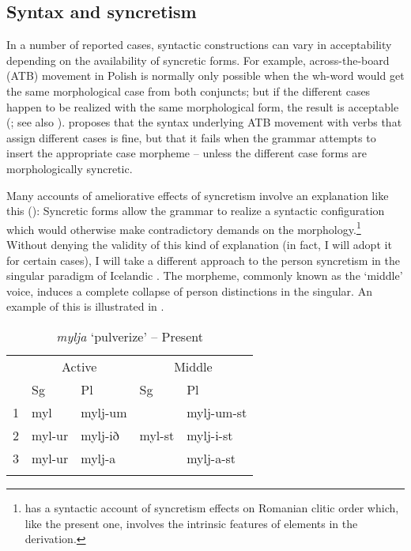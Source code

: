 \documentclass[output=paper]{langscibook}
\begin{document}
\subsection{Syntax and syncretism} 

In a number of reported cases, syntactic constructions can vary in acceptability depending on the availability of syncretic forms. For example, across-the-board (ATB)  movement in Polish is normally only possible when the wh-word would get the same morphological case from both conjuncts; but if the different cases happen to be realized with the same morphological form, the result is acceptable (\citealt{citko2005nature,hein2020case}; see also \citealt[fn2]{Ximenes:2007vs}). \citet{citko2005nature} proposes that the syntax underlying ATB movement with verbs that assign different cases is fine, but that it fails when the grammar attempts to insert the appropriate case morpheme -- unless the different case forms are morphologically syncretic. 

Many accounts of ameliorative effects of syncretism involve an explanation like this (\citealt{pullum1986phonological,bejar1999multiple,Kratzer:2009jq,Ussery:2009jd,Bjorkman2016}): Syncretic forms allow the grammar to realize a syntactic configuration which would otherwise make contradictory demands on the morphology.\footnote{\citet{Savescu:2009al} has a syntactic account of syncretism effects on Romanian clitic order which, like the present one,  involves the intrinsic features of elements in the derivation.}
 Without denying the validity of this kind of explanation (in fact, I will adopt it for certain cases), I will take a different approach to the person syncretism in the singular paradigm of Icelandic \stvsn. The \sti morpheme, commonly known as the `middle' voice, induces a complete collapse of person distinctions in the singular. An example of this is illustrated in . 

\begin{table}
 \caption{\label{woodxes}\textit{mylja} `pulverize' -- Present}
    \begin{tabular}{*5{l}} 
    \lsptoprule
         & \multicolumn{2}{c}{Active} & \multicolumn{2}{c}{Middle} \\\cmidrule(lr){2-3}\cmidrule(lr){4-5}
          & {Sg} & {Pl}  & {Sg} & {Pl} \\\midrule
        1 & myl & mylj-um    &         &  mylj-um-st \\
        2 & myl-ur & mylj-ið & myl-st &  mylj-i-st  \\
        3 & myl-ur  & mylj-a &        & mylj-a-st  \\
    \lspbottomrule
    \end{tabular}
\end{table}
\end{document}
